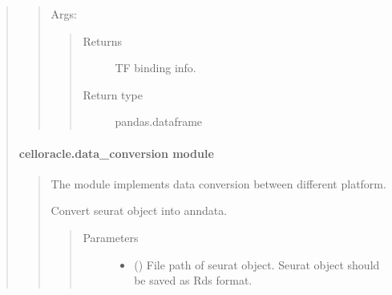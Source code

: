\documentclass[letterpaper,10pt,english]{sphinxmanual}
\begin{document}
\begin{quote}
\begin{quote}
\begin{fulllineitems}
Args:
\begin{quote}\begin{description}
\item[{Returns}] \leavevmode
TF binding info.

\item[{Return type}] \leavevmode
pandas.dataframe

\end{description}\end{quote}

\end{fulllineitems}

\end{quote}


\paragraph{celloracle.data\_conversion module}
\label{\detokenize{modules/celloracle.data_conversion:celloracle-data-conversion-module}}\label{\detokenize{modules/celloracle.data_conversion::doc}}\begin{quote}
\label{\detokenize{modules/celloracle.data_conversion:module-celloracle.data_conversion}}
The {\hyperref[\detokenize{modules/celloracle.data_conversion:module-celloracle.data_conversion}]{}} module implements data conversion between different platform.

\begin{fulllineitems}
\label{\detokenize{modules/celloracle.data_conversion:celloracle.data_conversion.seurat_object_to_anndata}}
Convert seurat object into anndata.
\begin{quote}\begin{description}
\item[{Parameters}] \leavevmode\begin{itemize}
\item {} 
 () \textendash{} File path of seurat object. Seurat object should be saved as Rds format.


\end{itemize}
\end{description}
\end{quote}
\end{fulllineitems}
\end{quote}
\end{quote}
\end{document}
